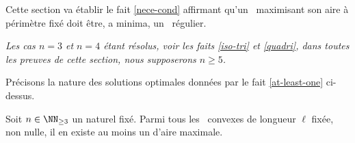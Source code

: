 Cette section va établir le fait \ref{nece-cond} affirmant qu'un \ngone\ maximisant son aire à périmètre fixé doit être, a minima, un \ngone\ régulier.


\begin{tcolorbox}
	\itshape\small
	Les cas $n = 3$ et $n = 4$ étant résolus, voir les faits \ref{iso-tri} et \ref{quadri}, dans toutes les preuves de cette section, nous supposerons $n \geq 5 $.
\end{tcolorbox}
















Précisons la nature des solutions optimales données par le fait \ref{at-least-one} ci-dessus.


\begin{fact} \label{at-least-one-convex}
    Soit $n \in \NN_{\geq3}$ un naturel fixé.
    Parmi tous les \ngones\ convexes de longueur $\ell$ fixée, non nulle, il en existe au moins un d'aire maximale.
\end{fact}



